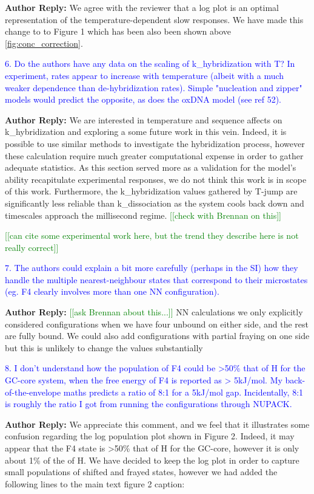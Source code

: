 \documentclass[11pt,a4paper]{letter} %
\newcommand*{\noteg}[1]{\textcolor{green}{[[#1]]}}		%
\begin{document}
\textbf{Author Reply:}   We agree with the reviewer that a log plot is an optimal representation of the temperature-dependent slow responses. We have made this change to to Figure 1 which has been also been shown above \ref{fig:conc_correction}.

\textcolor{blue}{6. Do the authors have any data on the scaling of k\_hybridization with T? In experiment, rates appear to increase with temperature (albeit with a much weaker dependence than de-hybridization rates). Simple "nucleation and zipper" models would predict the opposite, as does the oxDNA model (see ref 52).}

\textbf{Author Reply:}   We are interested in temperature and sequence affects on  k\_hybridization and exploring a some future work in this vein. Indeed, it is possible to use similar methods to investigate the hybridization process, however these calculation require much greater computational expense in order to gather adequate statistics. As this section served more as a validation for the model’s ability recapitulate experimental responses, we do not think this work is in scope of this work. Furthermore, the k\_hybridization values gathered by T-jump are significantly less reliable than k\_dissociation as the system cools back down and timescales approach the millisecond regime. \noteg{check with Brennan on this}

\noteg{can cite some experimental work here, but the trend they describe here is not really correct}

\textcolor{blue}{7. The authors could explain a bit more carefully (perhaps in the SI) how they handle the multiple nearest-neighbour states that correspond to their microstates (eg. F4 clearly involves more than one NN configuration).}

\textbf{Author Reply:}   \noteg{ask Brennan about this...} NN calculations we only explicitly considered configurations when we have four unbound on either side, and the rest are fully bound. We could also add configurations with partial fraying on one side but this is unlikely to change the values substantially

\textcolor{blue}{8. I don't understand how the population of F4 could be >50\% that of H for the GC-core system, when the free energy of F4 is reported as > 5kJ/mol. My back-of-the-envelope maths predicts a ratio of 8:1 for a 5kJ/mol gap. Incidentally, 8:1 is roughly the ratio I got from running the configurations through NUPACK.}

\textbf{Author Reply:}   We appreciate this comment, and we feel that it illustrates some confusion regarding the log population plot shown in Figure 2. Indeed, it may appear that the F4 state is >50\% that of H for the GC-core, however it is only about 1\% of the of H. We have decided to keep the log plot in order to capture small populations of shifted and frayed states, however we had added the following lines to the main text figure 2 caption:
\end{document}
